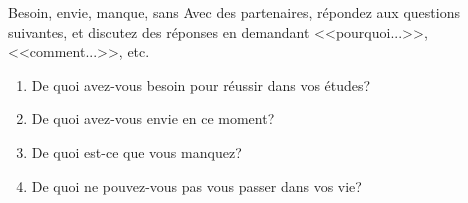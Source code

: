 \begin{frame}{Besoin, envie, manque, sans}
  Avec des partenaires, répondez aux questions suivantes, et discutez des réponses en demandant <<pourquoi...>>, <<comment...>>, etc.
  \begin{enumerate}
    \item De quoi avez-vous \alert{besoin} pour réussir dans vos études?
    \item De quoi avez-vous \alert{envie} en ce moment?
    \item De quoi est-ce que vous \alert{manquez}?
    \item De quoi ne pouvez-vous pas \alert{vous passer} dans vos vie?
  \end{enumerate}
\end{frame}